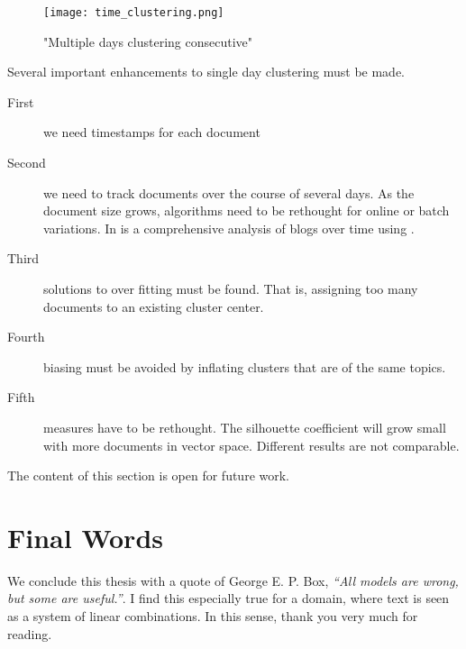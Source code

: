     \begin{figure}[h!]
      \centering
        \texttt{[image: time\_clustering.png]}
        \caption{"Multiple days clustering consecutive"}
        \label{time_clustering}
    \end{figure} 

  Several important enhancements to single day clustering must be made.

  \begin{description}
    \item[First] we need timestamps for each document
    \item[Second] we need to track documents over the course of several days. As the document size grows, algorithms need to be rethought for online or batch variations. In \cite{BlogTopicLDA2013} is a comprehensive analysis of blogs over time using \lda{}.
    \item[Third] solutions to over fitting must be found. That is, assigning too many documents to an existing cluster center.
    \item[Fourth] biasing must be avoided by inflating clusters that are of the same topics.
    \item[Fifth] measures have to be rethought. The silhouette coefficient will grow small with more documents in vector space. Different results are not comparable.
  \end{description}

  The content of this section is open for future work.

\section{Final Words}
We conclude this thesis with a quote of George E. P. Box, \emph{``All models are wrong, but some are useful.''}. I find this especially true for a domain, where text is seen as a system of linear combinations. In this sense, thank you very much for reading.

